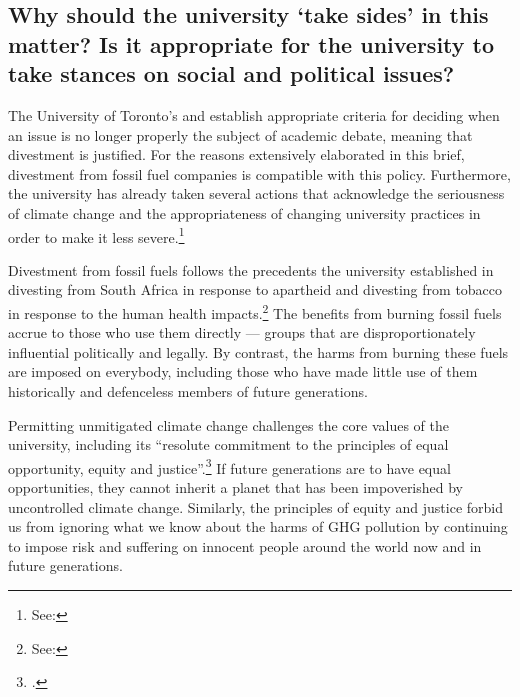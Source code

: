 \documentclass[10pt]{article}
\begin{document}
	\subsection{Why should the university `take sides' in this matter? Is it appropriate for the university to take stances on social and political issues?}
	\label{TakeSides}



The University of Toronto's  and  establish appropriate criteria for deciding when an issue is no longer properly the subject of academic debate, meaning that divestment is justified.
For the reasons extensively elaborated in this brief, divestment from fossil fuel companies is compatible with this policy.
Furthermore, the university has already taken several actions that acknowledge the seriousness of climate change and the appropriateness of changing university practices in order to make it less severe.\footnote{See: }



Divestment from fossil fuels follows the precedents the university established in divesting from South Africa in response to apartheid and divesting from tobacco in response to the human health impacts.\footnote{See: }
The benefits from burning fossil fuels accrue to those who use them directly --- groups that are disproportionately influential politically and legally.
By contrast, the harms from burning these fuels are imposed on everybody, including those who have made little use of them historically and defenceless members of future generations.






Permitting unmitigated climate change challenges the core values of the university, including its ``resolute commitment to the principles of equal opportunity, equity and justice''.\footcite{InstitutionalPurpose}
If future generations are to have equal opportunities, they cannot inherit a planet that has been impoverished by uncontrolled climate change.
Similarly, the principles of equity and justice forbid us from ignoring what we know about the harms of GHG pollution by continuing to impose risk and suffering on innocent people around the world now and in future generations.
\end{document}
